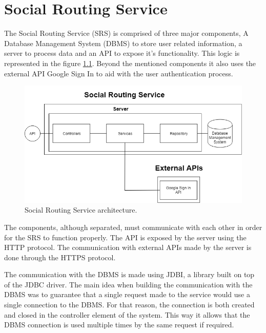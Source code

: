 \chapter{Social Routing Service}

The Social Routing Service (SRS) is comprised of three major components, 
A Database Management System (DBMS) to store user related information, a server to process data and an API to expose it's functionality.
This logic is represented in the figure \ref{fig:socialroutingservice}. Beyond the mentioned
components it also uses the external API Google Sign In to aid with the user authentication process.

\begin{figure}[ht]            
    \includegraphics[width=\textwidth]{images/project-structure/service-structure2.PNG}
    \caption{Social Routing Service architecture.}
    \label{fig:socialroutingservice}
\end{figure}  

The components, although separated, must communicate with each other in order for the SRS
to function properly. The API is exposed by the server using the HTTP protocol. The 
communication with external APIs made by the server is done through the HTTPS\cite{https} 
protocol.

The communication with the DBMS is made using JDBI\cite{jdbidocs}, a library built on top
of the JDBC\cite{jdbcdocs} driver. The main idea when building the communication with the DBMS
was to guarantee that a single request made to the service would use a single connection 
to the DBMS. For that reason, the connection is both created and closed in the controller
element of the system. This way it allows that the DBMS connection is used multiple times
by the same request if required.
\newpage

